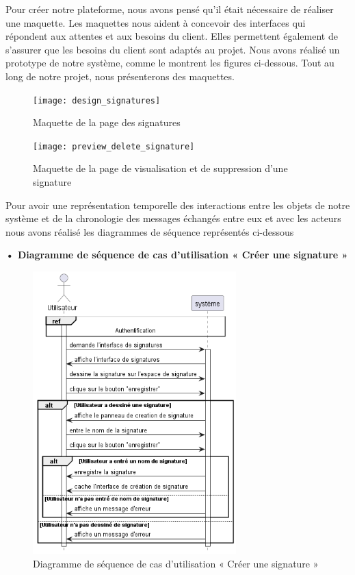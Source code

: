Pour créer notre plateforme, nous avons pensé qu'il était nécessaire de réaliser une maquette. Les maquettes nous aident à concevoir des interfaces qui répondent aux attentes et aux besoins du client. Elles permettent également de s'assurer que les besoins du client sont adaptés au projet. Nous avons réalisé un prototype de notre système, comme le montrent les figures ci-dessous. Tout au long de notre projet, nous présenterons des maquettes.

\begin{figure}[H]
  \centering
  \texttt{[image: design\_signatures]}
  \caption{Maquette de la page des signatures}
  \label{fig:design_signatures}
\end{figure}

\begin{figure}[H]
  \centering
  \texttt{[image: preview\_delete\_signature]}
  \caption{Maquette de la page de visualisation et de suppression d'une signature}
  \label{fig:design_preview_delete_signature}
\end{figure}

Pour avoir une représentation temporelle des interactions entre les objets de notre système et de la chronologie des messages échangés entre eux et avec les acteurs nous avons réalisé les diagrammes de séquence représentés ci-dessous

\textbf{•	Diagramme de séquence de cas d'utilisation « Créer une signature  »}
\begin{figure}[H]
  \centering
  \includegraphics[width=0.7\textwidth]{out/diagrams/signatures/create/create_signature}
  \caption{Diagramme de séquence de cas d'utilisation « Créer une signature  »}
  \label{fig:sequence_create_signature}
\end{figure}

